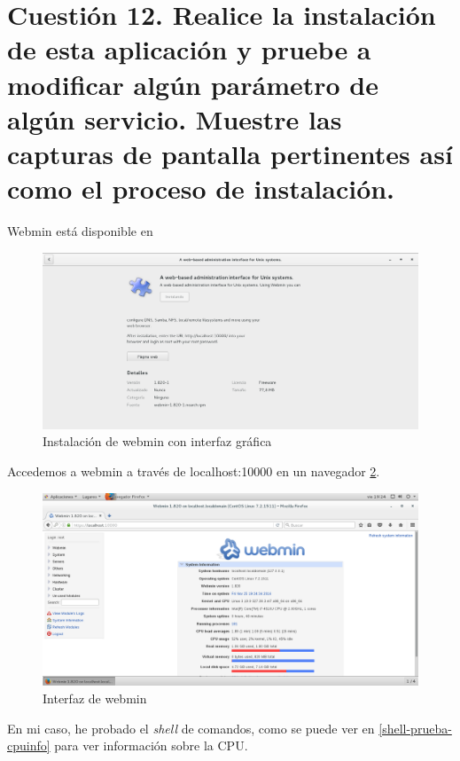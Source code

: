 \section{Cuestión 12. Realice la instalación de esta aplicación y pruebe a modificar algún parámetro de algún servicio. Muestre las capturas de pantalla pertinentes así como el proceso de instalación.}

Webmin está disponible en \cite{webmin}

\begin{figure}[H]
	\centering
	\includegraphics[scale=0.45]{instalacionwebmin.png}
	\caption{Instalación de webmin con interfaz gráfica} \label{instalacionwebmin}
\end{figure}

Accedemos a webmin a través de localhost:10000 en un navegador \ref{interfazwebmin}.

\begin{figure}[H]
	\centering
	\includegraphics[scale=0.45]{webmin-interfaz.png}
	\caption{Interfaz de webmin} \label{interfazwebmin}
\end{figure}

En mi caso, he probado el \textit{shell} de comandos, como se puede ver en \ref{shell-prueba-cpuinfo} para ver información sobre la CPU.

